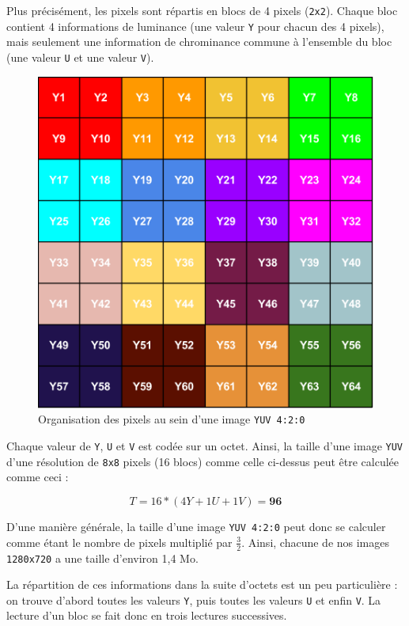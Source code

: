 \documentclass[11pt,a4paper]{article}
\begin{document}
\bigbreak
Plus précisément, les pixels sont répartis en blocs de 4 pixels (\texttt{2x2}).
Chaque bloc contient 4 informations de luminance (une valeur \texttt{Y} pour chacun des 4 pixels), mais seulement une information de chrominance commune à l'ensemble du bloc (une valeur \texttt{U} et une valeur \texttt{V}).

\begin{figure}[H]
\begin{center}
\includegraphics[scale=0.5]{images/yuv1.png}
\end{center}
\caption{Organisation des pixels au sein d'une image \texttt{YUV 4:2:0}}
\label{}
\end{figure}

\bigbreak
Chaque valeur de \texttt{Y}, \texttt{U} et \texttt{V} est codée sur un octet.
Ainsi, la taille d'une image \texttt{YUV} d'une résolution de \texttt{8x8} pixels (16 blocs) comme celle ci-dessus peut être calculée comme ceci :

$$ T = 16 * (4Y + 1U + 1V) = \mathbf{96}$$

\bigbreak

D'une manière générale, la taille d'une image \texttt{YUV 4:2:0} peut donc se calculer comme étant le nombre de pixels multiplié par $\frac{3}{2}$.
Ainsi, chacune de nos images \texttt{1280x720} a une taille d'environ 1,4 Mo.

\bigbreak
La répartition de ces informations dans la suite d'octets est un peu particulière : on trouve d'abord toutes les valeurs \texttt{Y}, puis toutes les valeurs \texttt{U} et enfin \texttt{V}.
La lecture d'un bloc se fait donc en trois lectures successives.
\end{document}
